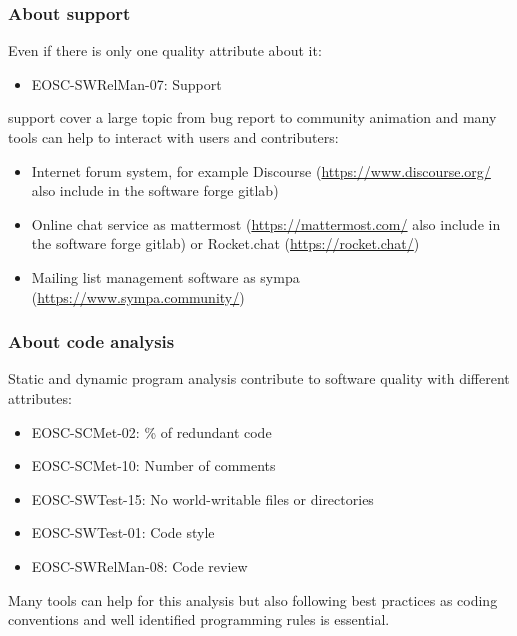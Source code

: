 \subsubsection{About support}

Even if there is only one quality attribute about it: 

\begin{itemize}
  \item EOSC-SWRelMan-07: Support
\end{itemize}

support cover a large topic from bug report to community animation and
many tools can help to interact with users and contributers:

\begin{itemize}
\item Internet forum system, for example Discourse
  (\url{https://www.discourse.org/} also include in the software
  forge gitlab)
\item Online chat service as mattermost (\url{https://mattermost.com/} also include in the software
  forge gitlab) or Rocket.chat (\url{https://rocket.chat/})
\item Mailing list management software as sympa
  (\url{https://www.sympa.community/})
\end{itemize}

\subsubsection{About code analysis}

Static and dynamic program analysis contribute to software quality
with different attributes:
\begin{itemize}
  \item EOSC-SCMet-02: \% of redundant code
  \item EOSC-SCMet-10: Number of comments
  \item EOSC-SWTest-15: No world-writable files or directories
  \item EOSC-SWTest-01: Code style
  \item EOSC-SWRelMan-08: Code review
\end{itemize}

Many tools can help for this analysis but also following best
practices as coding conventions and well identified programming rules
is essential.


